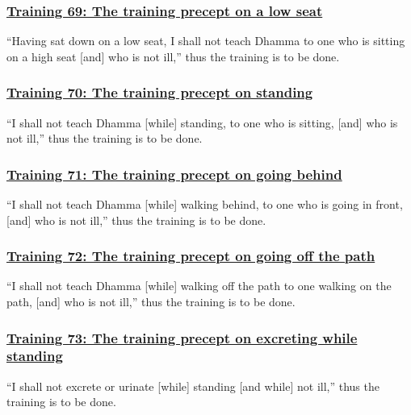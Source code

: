 \subsubsection*{\hyperref[sekh69]{Training 69: The training precept on a low seat}}
\label{training69}
``Having sat down on a low seat, I shall not teach Dhamma to one who is sitting on a high seat [and] who is not ill,'' thus the training is to be done.



\subsubsection*{\hyperref[sekh70]{Training 70: The training precept on standing}}
\label{training70}
``I shall not teach Dhamma [while] standing, to one who is sitting, [and] who is not ill,'' thus the training is to be done.



\subsubsection*{\hyperref[sekh71]{Training 71: The training precept on going behind}}
\label{training71}
``I shall not teach Dhamma [while] walking behind, to one who is going in front, [and] who is not ill,'' thus the training is to be done.



\subsubsection*{\hyperref[sekh72]{Training 72: The training precept on going off the path}}
\label{training72}
``I shall not teach Dhamma [while] walking off the path to one walking on the path, [and] who is not ill,'' thus the training is to be done.



\subsubsection*{\hyperref[sekh73]{Training 73: The training precept on excreting while standing}}
\label{training73}
``I shall not excrete or urinate [while] standing [and while] not ill,'' thus the training is to be done.




